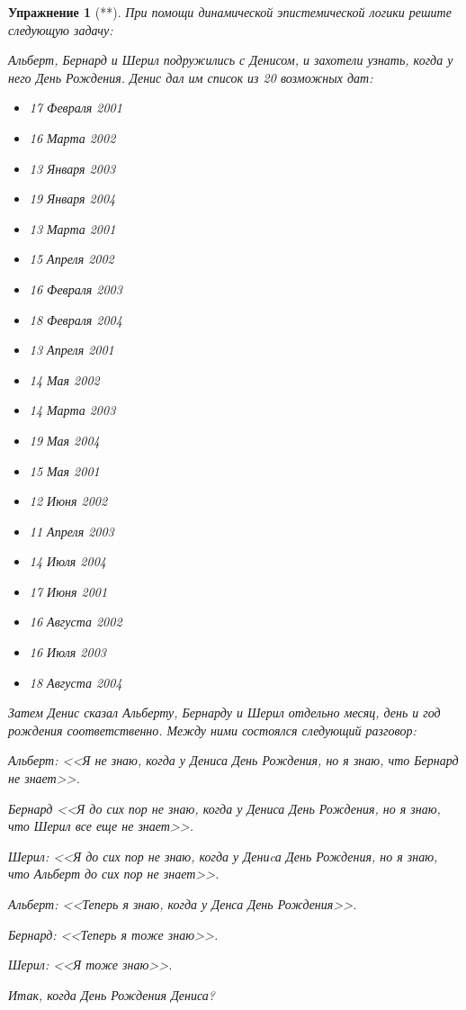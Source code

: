\documentclass[11pt]{article}
\newtheorem{exercise}[theorem]{Упражнение}
\begin{document}
\begin{exercise}[**] При помощи динамической эпистемической логики решите следующую задачу:

Альберт, Бернард и Шерил подружились с Денисом, и захотели узнать, когда у него День Рождения. Денис дал им список из 20 возможных дат: 
\begin{multicols}{3}
\begin{itemize}
\item 17 Февраля 2001
\item 16 Марта 2002
\item 13 Января 2003
\item 19 Января 2004
\item 13 Марта 2001
\item 15 Апреля 2002
\item 16 Февраля 2003
\item 18 Февраля 2004
\item 13 Апреля 2001
\item 14 Мая 2002
\item 14 Марта 2003
\item 19 Мая 2004
\item 15 Мая 2001
\item 12 Июня 2002 
\item 11 Апреля 2003
\item 14 Июля 2004 
\item 17 Июня 2001 
\item 16 Августа 2002 
\item 16 Июля 2003 
\item 18 Августа 2004
\end{itemize}
\end{multicols}
Затем Денис сказал Альберту, Бернарду и Шерил отдельно месяц, день и год рождения соответственно. Между ними состоялся следующий разговор: 
\begin{description}
\item Альберт: <<Я не знаю, когда у Дениса День Рождения, но я знаю, что Бернард не знает>>. 
\item Бернард <<Я до сих пор не знаю, когда у Дениса  День Рождения, но я знаю, что Шерил все еще не знает>>. 
\item Шерил: <<Я до сих пор не знаю, когда у Дениcа День Рождения, но я знаю, что Альберт до сих пор не знает>>. 
\item Альберт: <<Теперь я знаю, когда у Денса День Рождения>>.
\item Бернард: <<Теперь я тоже знаю>>.
\item Шерил: <<Я тоже знаю>>.
\end{description}

\begin{center}
Итак, когда День Рождения Дениса?	
\end{center}
\end{exercise}
\end{document}
